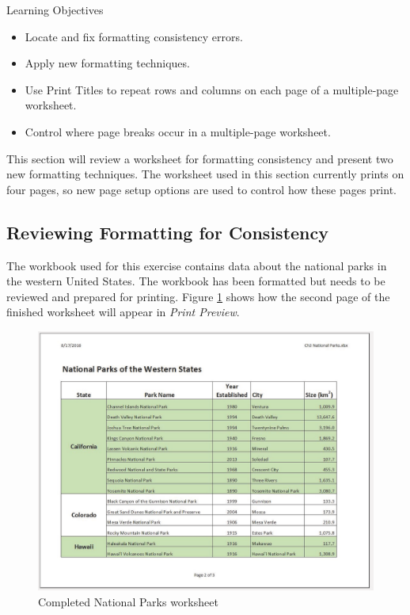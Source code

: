 \begin{center}
	\begin{objbox}{Learning Objectives}
		\begin{itemize}
			\setlength{\itemsep}{0pt}
			\setlength{\parskip}{0pt}
			\setlength{\parsep}{0pt}

			\item Locate and fix formatting consistency errors.
			\item Apply new formatting techniques.
			\item Use Print Titles to repeat rows and columns on each page of a multiple-page worksheet.
			\item Control where page breaks occur in a multiple-page worksheet.
			
		\end{itemize}
	\end{objbox}
\end{center}

This section will review a worksheet for formatting consistency and present two new formatting techniques. The worksheet used in this section currently prints on four pages, so new page setup options are used to control how these pages print. 

\subsection{Reviewing Formatting for Consistency}

The workbook used for this exercise contains data about the national parks in the western United States. The workbook has been formatted but needs to be reviewed and prepared for printing. Figure \ref{03:fig26} shows how the second page of the finished worksheet will appear in \textit{Print Preview}.

\begin{figure}[H]
	\centering
	\includegraphics[width=\maxwidth{.95\linewidth}]{gfx/ch03_fig26}
	\caption{Completed National Parks worksheet}
	\label{03:fig26}
\end{figure}

